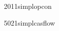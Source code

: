 \documentclass[
11pt,
a4paper,
final,
notitlepage,
oneside,
openany,
]{report}
\begin{document}
{2011simplopcon}

{5021simplcasflow}
\end{document}
